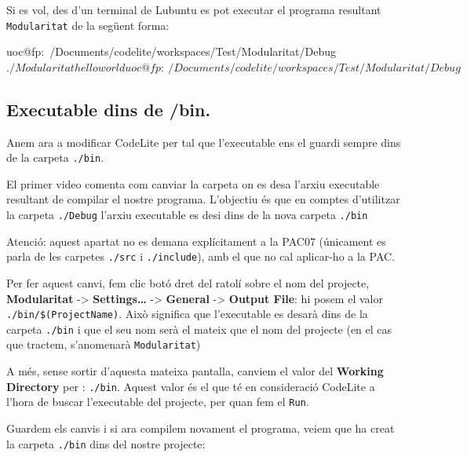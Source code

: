 \documentclass[]{book}
\newenvironment{Shaded}{\begin{snugshade}}{\end{snugshade}}
\newcommand{\NormalTok}[1]{#1}
\begin{document}
Si es vol, des d'un terminal de Lubuntu es pot executar el programa
resultant \texttt{Modularitat} de la següent forma:

\begin{Shaded}
\begin{Highlighting}[]
\NormalTok{uoc@fp:~/Documents/codelite/workspaces/Test/Modularitat/Debug$ ./Modularitat}
\NormalTok{hello world}
\NormalTok{uoc@fp:~/Documents/codelite/workspaces/Test/Modularitat/Debug$}
\end{Highlighting}
\end{Shaded}

\subsection{Executable dins de /bin.}\label{executable-dins-de-bin.}

Anem ara a modificar CodeLite per tal que l'executable ens el guardi
sempre dins de la carpeta \texttt{./bin}.

El primer video comenta com canviar la carpeta on es desa l'arxiu
executable resultant de compilar el nostre programa. L'objectiu és que
en comptes d'utilitzar la carpeta \texttt{./Debug} l'arxiu executable es
desi dins de la nova carpeta \texttt{./bin}

Atenció: aquest apartat no es demana explícitament a la PAC07 (únicament
es parla de les carpetes \texttt{./src} i \texttt{./include}), amb el
que no cal aplicar-ho a la PAC.

Per fer aquest canvi, fem clic botó dret del ratolí sobre el nom del
projecte, \textbf{Modularitat} -\textgreater{} \textbf{Settings\ldots{}}
-\textgreater{} \textbf{General} -\textgreater{} \textbf{Output File}:
hi posem el valor \texttt{./bin/\$(ProjectName)}. Això significa que
l'executable es desarà dins de la carpeta \texttt{./bin} i que el seu
nom serà el mateix que el nom del projecte (en el cas que tractem,
s'anomenarà \texttt{Modularitat})

A més, sense sortir d'aquesta mateixa pantalla, canviem el valor del
\textbf{Working Directory} per : \texttt{./bin}. Aquest valor és el que
té en consideració CodeLite a l'hora de buscar l'executable del
projecte, per quan fem el \texttt{Run}.

Guardem els canvis i si ara compilem novament el programa, veiem que ha
creat la carpeta \texttt{./bin} dins del nostre projecte:
\end{document}
